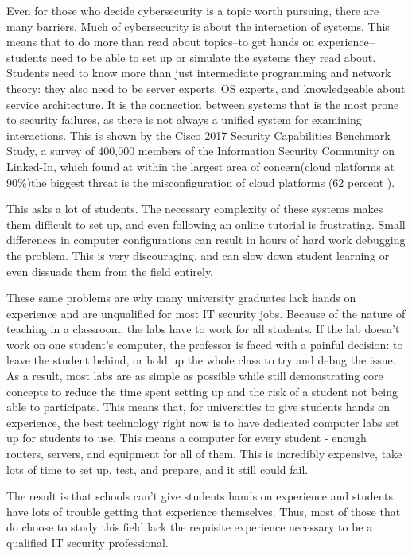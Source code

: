 \documentclass[openright]{report}
\begin{document}
\par Even for those who decide cybersecurity is a topic worth pursuing, there are many barriers. Much of cybersecurity is about the interaction of systems. This means that to do more than read about topics--to get hands on experience--students need to be able to set up or simulate the systems they read about. Students need to know more than just intermediate programming and network theory: they also need to be server experts, OS experts, and knowledgeable about service architecture. It is the connection between systems that is the most prone to security failures, as there is not always a unified system for examining interactions. This is shown by the Cisco 2017 Security Capabilities Benchmark Study, a survey of 400,000 members of the Information Security Community on Linked-In, which found at within the largest area of concern(cloud platforms at 90\%)the biggest threat is the misconfiguration of cloud platforms (62 percent ).\cite{Cisco}

\par This asks a lot of students. The necessary complexity of these systems makes them difficult to set up, and even following an online tutorial is frustrating. Small differences in computer configurations can result in hours of hard work debugging the problem. This is very discouraging, and can slow down student learning or even dissuade them from the field entirely. 

\par These same problems are why many university graduates lack hands on experience and are unqualified for most IT security jobs. Because of the nature of teaching in a classroom, the labs have to work for all students. If the lab doesn't work on one student's computer, the professor is faced with a painful decision: to leave the student behind, or hold up the whole class to try and debug the issue. As a result, most labs are as simple as possible while still demonstrating core concepts to reduce the time spent setting up and the risk of a student not being able to participate\cite{ibrahiminterview}. This means that, for universities to give students hands on experience, the best technology right now is to have dedicated computer labs set up for students to use. This means a computer for every student - enough routers, servers, and equipment for all of them. This is incredibly expensive, take lots of time to set up, test, and prepare, and it still could fail.

\par The result is that schools can't give students hands on experience and students have lots of trouble getting that experience themselves. Thus, most of those that do choose to study this field lack the requisite experience necessary to be a qualified IT security professional.
\end{document}
